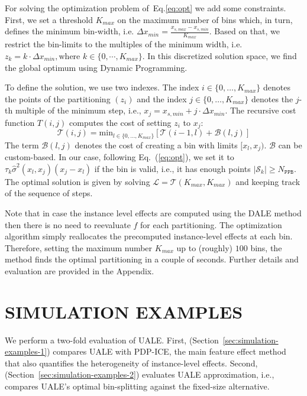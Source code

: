\documentclass[twoside]{article}
\begin{document}
For solving the optimization problem of~Eq.\ref{eq:opt} we add some
constraints. First, we set a threshold \(K_{max}\) on the maximum
number of bins which, in turn, defines the minimum bin-width,
i.e. \(\Delta x_{min} = \frac{x_{s, max} - x_{s,min}}{K_{max}}\).
Based on that, we restrict the bin-limits to the multiples of the
minimum width, i.e.
\(z_k = k\cdot \Delta x_{min}, \text{where } k \in \{0 , \cdots,
K_{max}\} \). In this discretized solution space, we find the global
optimum using Dynamic Programming. 

To define the solution, we use two indexes. The index
\(i \in \{0, \ldots, K_{max}\}\) denotes the points of the
partitioning \((z_i)\) and the index \(j \in \{0, \ldots, K_{max}\} \)
denotes the \(j\)-th multiple of the minimum step, i.e.,
\(x_j = x_{s,min} + j \cdot \Delta x_{min}\). The recursive cost
function \(T(i,j)\) computes the cost of setting \(z_i\) to \(x_j\):
\begin{equation}
  \label{eq:recursive_cost}
  \mathcal{T}(i,j) = \mathrm{min}_{l \in \{0, \ldots, K_{max}\}} \left [ \mathcal{T}(i-1, l) + \mathcal{B}(l, j) \right ]
\end{equation}
%
The term \(\mathcal{B}(l, j)\) denotes the cost of creating a bin with
limits \([x_l, x_j)\). \(\mathcal{B}\) can be custom-based. In our
case, following Eq.~(\ref{eq:opt}), we set it to
\(\tau_k \hat{\sigma}^2(x_l, x_j) (x_j-x_l)\) if the bin is valid,
i.e., it has enough points \(|\mathcal{S}_k| \geq
N_{\mathtt{PPB}}\). The
optimal solution is given by solving
\(\mathcal{L} = \mathcal{T}(K_{max}, K_{max})\) and keeping track of
the sequence of steps.

Note that in case the instance level effects are computed using the
DALE method then there is no need to reevaluate \(f\) for each
partitioning. The optimization algorithm simply reallocates the
precomputed instance-level effects at each bin. Therefore, setting the
maximum number \(K_{max}\) up to (roughly) \(100\) bins, the method
finds the optimal partitioning in a couple of seconds. Further details
and evaluation are provided in the Appendix.

\section{SIMULATION EXAMPLES}
\label{sec:simulation-examples}

We perform a two-fold evaluation of UALE. First,
(Section~\ref{sec:simulation-examples-1}) compares UALE with PDP-ICE,
the main feature effect method that also quantifies the heterogeneity
of instance-level effects. Second,
(Section~\ref{sec:simulation-examples-2}) evaluates UALE
approximation, i.e., compares UALE's optimal bin-splitting against the
fixed-size alternative.
\end{document}

